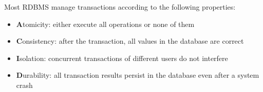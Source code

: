 Most RDBMS manage transactions according to the following properties:
\begin{itemize}
    \item \textbf{A}tomicity: either execute all operations or none of them
    \item \textbf{C}onsistency: after the transaction, all values in the database are correct
    \item \textbf{I}solation: concurrent transactions of different users do not interfere
    \item \textbf{D}urability: all transaction results persist in the database even after a system crash
\end{itemize}
